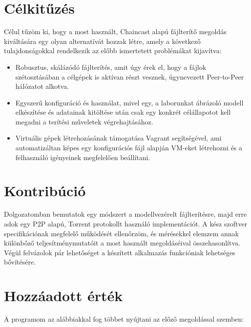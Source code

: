 \section{Célkitűzés}

Célul tűzöm ki, hogy a most használt, Chaincast alapú fájlterítő megoldás kiváltására egy olyan alternatívát hozzak létre, amely a következő tulajdonságokkal rendelkezik az előbb ismertetett problémákat kijavítva:

\begin{itemize}
  \item Robusztus, skálázódó fájlterítés, amit úgy érek el, hogy a fájlok szétosztásában a célgépek is aktívan részt vesznek, úgynevezett Peer-to-Peer\cite{p2pdef} hálózatot alkotva.
  \item Egyszerű konfiguráció és használat, mivel egy, a laborunkat ábrázoló modell elkészítése és adatainak kitöltése után csak egy konkrét célállapotot kell megadni a terítési műveletek végrehajtásához.
  \item Virtuális gépek létrehozásának támogatása Vagrant\cite{vagrant} segítségével, ami automatizáltan képes egy konfigurációs fájl alapján VM-eket létrehozni és a felhasználó igényeinek megfelelően beállítani.
\end{itemize}

\section{Kontribúció}
Dolgozatomban bemutatok egy módszert a modellvezérelt fájlterítésre, majd erre adok egy P2P alapú, Torrent protokollt használó implementációt. A kész szoftver specifikációnak megfelelő működését ellenőrzöm, és mérésekkel elemzem annak különbőző teljesítménymutatóit a most használt megoldáséival összehasonlítva. Végül felvázolok pár lehetőséget a készített alkalmazás funkcióniak lehetséges bővítésére.

\section{Hozzáadott érték}
A programom az alábbiakkal fog többet nyújtani az előző megoldással szemben:

